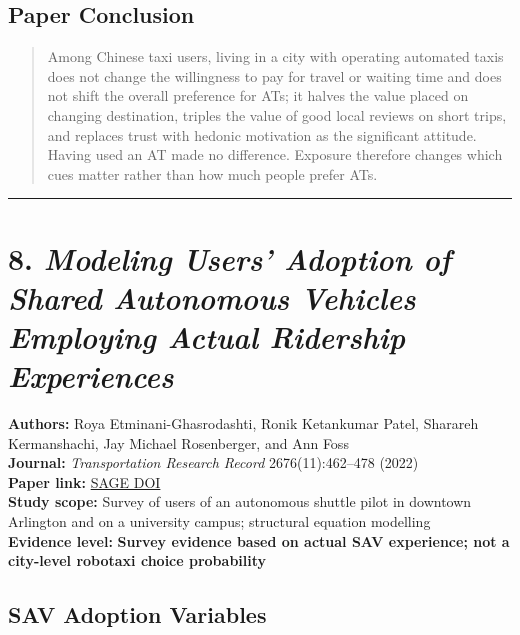 \documentclass[10pt,a4paper]{article}
\begin{document}
\hypertarget{paper-conclusion-6}{%
\subsection{Paper Conclusion}\label{paper-conclusion-6}}

\begin{quote}
Among Chinese taxi users, living in a city with operating automated taxis does not change the willingness to pay for travel or waiting time and does not shift the overall preference for ATs; it halves the value placed on changing destination, triples the value of good local reviews on short trips, and replaces trust with hedonic motivation as the significant attitude. Having used an AT made no difference. Exposure therefore changes which cues matter rather than how much people prefer ATs.
\end{quote}


\begin{center}\rule{0.5\linewidth}{0.5pt}\end{center}

\hypertarget{modeling-users-adoption-of-shared-autonomous-vehicles}{%
\section{\texorpdfstring{8. \emph{Modeling Users' Adoption of Shared Autonomous Vehicles Employing Actual Ridership Experiences}}{8. Modeling Users' Adoption of Shared Autonomous Vehicles Employing Actual Ridership Experiences}}\label{modeling-users-adoption-of-shared-autonomous-vehicles}}

\textbf{Authors:} Roya Etminani-Ghasrodashti, Ronik Ketankumar Patel,
Sharareh Kermanshachi, Jay Michael Rosenberger, and Ann Foss\\
\textbf{Journal:} \emph{Transportation Research Record}
2676(11):462--478 (2022)\\
\textbf{Paper link:}
\href{https://doi.org/10.1177/03611981221093632}{SAGE DOI}\\
\textbf{Study scope:} Survey of users of an autonomous shuttle pilot
in downtown Arlington and on a university campus; structural equation modelling\\
\textbf{Evidence level:}
\textbf{Survey evidence based on actual SAV experience;
not a city-level robotaxi choice probability}

\subsection{SAV Adoption Variables}
\end{document}
